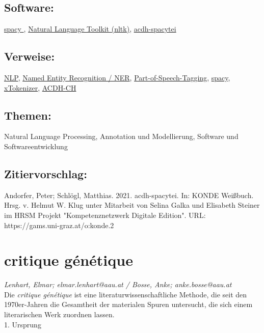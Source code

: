 \documentclass{article}
\begin{document}
        \subsection*{Software:}\href{https://spacy.io/}{spacy }, \href{https://www.nltk.org/}{Natural Language Toolkit
                           (nltk)}, \href{https://github.com/acdh-oeaw/acdh-spacytei}{acdh-spacytei}\subsection*{Verweise:}\href{https://gams.uni-graz.at/o:konde.145}{NLP}, \href{https://gams.uni-graz.at/o:konde.141}{Named Entity Recognition /
                           NER}, \href{https://gams.uni-graz.at/o:konde.156}{Part-of-Speech-Tagging}, \href{https://gams.uni-graz.at/o:konde.170}{spacy}, \href{https://gams.uni-graz.at/o:konde.216}{xTokenizer}, \href{https://gams.uni-graz.at/o:konde.1}{ACDH-CH}\subsection*{Themen:}Natural Language Processing, Annotation und Modellierung, Software und Softwareentwicklung\subsection*{Zitiervorschlag:}Andorfer, Peter; Schlögl, Matthias. 2021. acdh-spacytei. In: KONDE Weißbuch. Hrsg. v. Helmut W. Klug unter Mitarbeit von Selina Galka und Elisabeth Steiner im HRSM Projekt "Kompetenznetzwerk Digitale Edition". URL: https://gams.uni-graz.at/o:konde.2\newpage\section*{critique génétique} \emph{Lenhart, Elmar; elmar.lenhart@aau.at / Bosse, Anke; anke.bosse@aau.at }\\
        
    Die \emph{critique génétique} ist eine literaturwissenschaftliche Methode, die seit den 1970er-Jahren die Gesamtheit der materialen Spuren untersucht, die sich einem literarischen Werk zuordnen lassen.\\
            
        1. Ursprung\\
            
\end{document}
